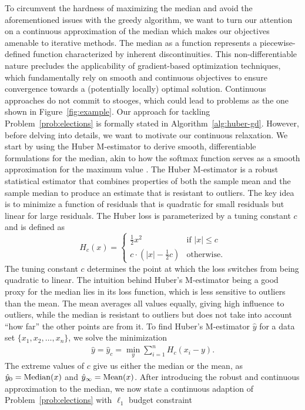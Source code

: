 To circumvent the hardness of
maximizing the median
and avoid the aforementioned
issues with the greedy algorithm,
we want to turn our attention on
a continuous approximation of the median which
makes our objectives amenable to iterative methods.
The median as a function represents a piecewise-defined
function characterized by inherent discontinuities.
This non-differentiable nature precludes the applicability
of gradient-based optimization techniques, which
fundamentally rely on smooth and continuous objectives
to ensure convergence towards a (potentially locally)
optimal solution. 
Continuous approaches do not commit
to stooges, which could lead to problems as the one
shown in Figure~\ref{fig:example}.
Our approach for tackling Problem~\ref{prob:elections} is
formally stated in Algorithm~\ref{alg:huber-gd}.
However, before delving into details, we
want to motivate our continuous relaxation. We start by
using the Huber M-estimator to derive smooth,
differentiable formulations for the median,
akin to how the softmax function serves as a smooth
approximation for the maximum value
\cite{brown2001smoothed,hampel2011smoothing}.
The Huber M-estimator is a robust statistical estimator that
combines properties of both the sample mean and the sample
median to produce an estimate that is resistant to outliers.
The key idea is to minimize a function of residuals that is
quadratic for small residuals but linear for large residuals.
The Huber loss is parameterized by a tuning constant $c$ and is defined as 
\[
    H_c(x) =
    \begin{cases} 
        \frac 1 2 x^2 & \textrm{if } |x| \le c \\
        c \cdot \left(|x| - \frac 1 2 c\right) & \textrm{otherwise} .
    \end{cases} 
\]
%
The tuning constant $c$ determines the point at which the loss switches from being quadratic to linear. The intuition behind Huber's M-estimator being a good proxy for the median lies in its loss function, which is less sensitive to outliers than the mean. The mean averages all values equally, giving high influence to outliers, while the median is resistant to outliers but does not take into account ``how far'' the other points are from it.  To find Huber's M-estimator $\hat y$ for a data set \( \{ x_1, x_2, \ldots, x_n \} \), we
solve the minimization
\begin{align}
    \label{eq:y-star}
    \hat y = \hat y_c = \min_y \sum_{i=1}^{n} H_c(x_i - y) .
\end{align}
The extreme values of $c$
give us either the median or
the mean, as $\hat y_0 = \mathrm{Median}(x)$
and $\hat y_\infty = \mathrm{Mean}(x)$. After introducing the robust and continuous
approximation to the median, we now state a continuous adaption of
Problem~\ref{prob:elections} with $\ell_1$ budget constraint~\cite{chan2021hardness}


